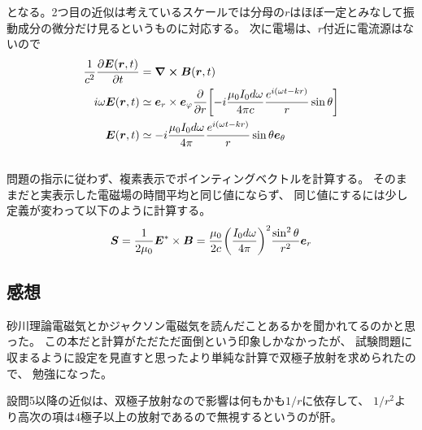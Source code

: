 \documentclass[../../sp_2017.tex]{subfiles}
\begin{document}
となる。2つ目の近似は考えているスケールでは分母の\(r\)はほぼ一定とみなして振動成分の微分だけ見るというものに対応する。
次に電場は、\(r\)付近に電流源はないので
\begin{equation}\begin{aligned}[b]
    \frac{1}{c^2}\pdv{\vb*{E}(\vb*{r},t)}{t}
    &=\curl \vb*{B}(\vb*{r},t)\\
    i\omega\vb*{E}(\vb*{r},t)
    &\simeq \vb*{e}_r\times\vb*{e}_\varphi \pdv{r}\qty[-i\frac{\mu_0I_0 d\omega}{4\pi c}\frac{e^{i(\omega t-kr)}}{r}\sin\theta]\\
    \vb*{E}(\vb*{r},t)
    &\simeq -i\frac{\mu_0I_0 d\omega}{4\pi}\frac{e^{i(\omega t-kr)}}{r}\sin\theta \vb*{e}_\theta
\end{aligned}\end{equation}


\subsection{}
問題の指示に従わず、複素表示でポインティングベクトルを計算する。
そのままだと実表示した電磁場の時間平均と同じ値にならず、
同じ値にするには少し定義が変わって以下のように計算する。
\begin{equation}\begin{aligned}[b]
    \vb*{S} = \frac{1}{2\mu_0}\vb*{E}^{*}\times \vb*{B}
    = \frac{\mu_0}{2c}\qty(\frac{I_0 d\omega}{4\pi})^2\frac{\sin^2\theta}{r^2} \vb*{e}_r
\end{aligned}\end{equation}

\subsection{}


\subsection*{感想}
砂川理論電磁気とかジャクソン電磁気を読んだことあるかを聞かれてるのかと思った。
この本だと計算がただただ面倒という印象しかなかったが、
試験問題に収まるように設定を見直すと思ったより単純な計算で双極子放射を求められたので、
勉強になった。

設問5以降の近似は、双極子放射なので影響は何もかも\(1/r\)に依存して、
\(1/r^2\)より高次の項は4極子以上の放射であるので無視するというのが肝。
\end{document}
